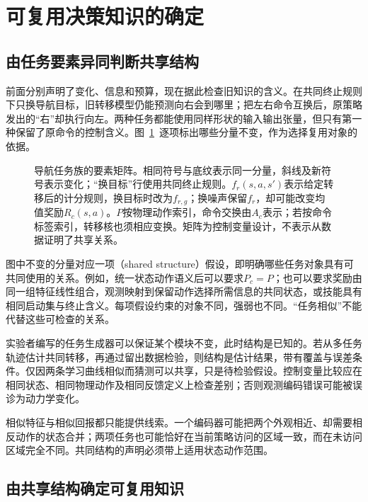 \section{可复用决策知识的确定}
\label{sec:rl-transfer-knowledge}

\subsection{由任务要素异同判断共享结构}
\label{sec:rl-transfer-sharing}

前面分别声明了变化、信息和预算，现在据此检查旧知识的含义。在共同终止规则下只换导航目标，旧转移模型仍能预测向右会到哪里；把左右命令互换后，原策略发出的“右”却执行向左。两种任务都能使用同样形状的输入输出张量，但只有第一种保留了原命令的控制含义。图~\ref{fig:rl-transfer-components}~逐项标出哪些分量不变，作为选择复用对象的依据。

\begin{figure}[htbp]
  \centering
  
  \caption{导航任务族的要素矩阵。相同符号与底纹表示同一分量，斜线及新符号表示变化；“换目标”行使用共同终止规则。$f_r(s,a,s')$表示给定转移后的计分规则，换目标时改为$f_{r,g}$；换噪声保留$f_r$，却可能改变均值奖励$R_c(s,a)$。$P$按物理动作索引，命令交换由$A_c$表示；若按命令标签索引，转移核也须相应变换。矩阵为控制变量设计，不表示从数据证明了共享关系。}
  \label{fig:rl-transfer-components}
\end{figure}

图中不变的分量对应一项（shared structure）假设，即明确哪些任务对象具有可共同使用的关系。例如，统一状态动作语义后可以要求$P_c=P$；也可以要求奖励由同一组特征线性组合，观测映射到保留动作选择所需信息的共同状态，或技能具有相同启动集与终止含义。每项假设约束的对象不同，强弱也不同。“任务相似”不能代替这些可检查的关系。

实验者编写的任务生成器可以保证某个模块不变，此时结构是已知的。若从多任务轨迹估计共同转移，再通过留出数据检验，则结构是估计结果，带有覆盖与误差条件。仅因两条学习曲线相似而猜测可以共享，只是待检验假设。控制变量比较应在相同状态、相同物理动作及相同反馈定义上检查差别；否则观测编码错误可能被误诊为动力学变化。

相似特征与相似回报都只能提供线索。一个编码器可能把两个外观相近、却需要相反动作的状态合并；两项任务也可能恰好在当前策略访问的区域一致，而在未访问区域完全不同。共同结构的声明必须带上适用状态动作范围。

\subsection{由共享结构确定可复用知识}
\label{sec:rl-transfer-objects}

